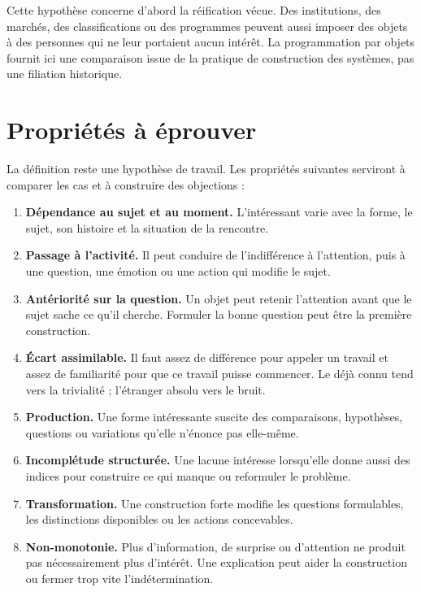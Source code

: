 \documentclass[11pt,a4paper]{article}
\begin{document}
Cette hypothèse concerne d'abord la réification vécue. Des institutions, des
marchés, des classifications ou des programmes peuvent aussi imposer des objets
à des personnes qui ne leur portaient aucun intérêt. La programmation par
objets fournit ici une comparaison issue de la pratique de construction des
systèmes, pas une filiation historique.

\section{Propriétés à éprouver}

La définition reste une hypothèse de travail. Les propriétés suivantes serviront
à comparer les cas et à construire des objections :

\begin{enumerate}
  \item \textbf{Dépendance au sujet et au moment.} L'intéressant varie avec la
        forme, le sujet, son histoire et la situation de la rencontre.
  \item \textbf{Passage à l'activité.} Il peut conduire de l'indifférence à
        l'attention, puis à une question, une émotion ou une action qui modifie
        le sujet.
  \item \textbf{Antériorité sur la question.} Un objet peut retenir l'attention
        avant que le sujet sache ce qu'il cherche. Formuler la bonne question
        peut être la première construction.
  \item \textbf{Écart assimilable.} Il faut assez de différence pour appeler un
        travail et assez de familiarité pour que ce travail puisse commencer.
        Le déjà connu tend vers la trivialité ; l'étranger absolu vers le bruit.
  \item \textbf{Production.} Une forme intéressante suscite des comparaisons,
        hypothèses, questions ou variations qu'elle n'énonce pas elle-même.
  \item \textbf{Incomplétude structurée.} Une lacune intéresse lorsqu'elle donne
        aussi des indices pour construire ce qui manque ou reformuler le
        problème.
  \item \textbf{Transformation.} Une construction forte modifie les questions
        formulables, les distinctions disponibles ou les actions concevables.
  \item \textbf{Non-monotonie.} Plus d'information, de surprise ou d'attention
        ne produit pas nécessairement plus d'intérêt. Une explication peut
        aider la construction ou fermer trop vite l'indétermination.

\end{enumerate}
\end{document}
